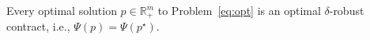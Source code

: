 
	


	

\begin{lemma}
	\label{lmm:Psi-opt}
	Every optimal solution $p \in \mathbb{R}_+^m$ to Problem~\eqref{eq:opt} is an optimal $\delta$-robust contract, i.e., $\Psi(p) = \Psi(p^\star)$.
\end{lemma}

